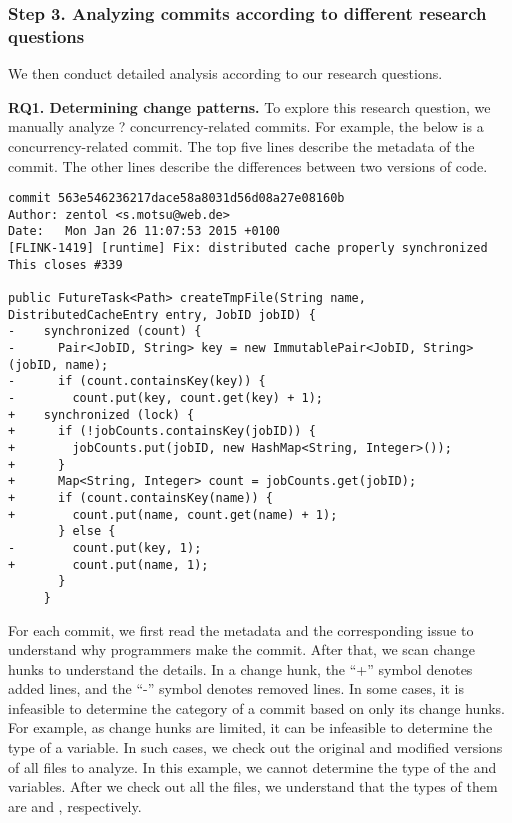 \subsubsection{Step 3. Analyzing commits according to different research questions} We then conduct detailed analysis according to our research questions.

\textbf{RQ1. Determining change patterns.} To explore this research question, we manually analyze ? concurrency-related commits. For example, the below is a concurrency-related commit. The top five lines describe the metadata of the commit. The other lines describe the differences between two versions of code.

\begin{lstlisting}
commit 563e546236217dace58a8031d56d08a27e08160b
Author: zentol <s.motsu@web.de>
Date:   Mon Jan 26 11:07:53 2015 +0100
[FLINK-1419] [runtime] Fix: distributed cache properly synchronized
This closes #339

public FutureTask<Path> createTmpFile(String name, DistributedCacheEntry entry, JobID jobID) {
-    synchronized (count) {
-      Pair<JobID, String> key = new ImmutablePair<JobID, String>(jobID, name);
-      if (count.containsKey(key)) {
-        count.put(key, count.get(key) + 1);
+    synchronized (lock) {
+      if (!jobCounts.containsKey(jobID)) {
+        jobCounts.put(jobID, new HashMap<String, Integer>());
+      }
+      Map<String, Integer> count = jobCounts.get(jobID);
+      if (count.containsKey(name)) {
+        count.put(name, count.get(name) + 1);
       } else {
-        count.put(key, 1);
+        count.put(name, 1);
       }
     }
\end{lstlisting}

For each commit, we first read the metadata and the corresponding issue to understand why programmers make the commit. After that, we scan change hunks to understand the details. In a change hunk, the ``+'' symbol denotes added lines, and the ``-'' symbol denotes removed lines. In some cases, it is infeasible to determine the category of a commit based on only its change hunks. For example, as change hunks are limited, it can be infeasible to determine the type of a variable. In such cases, we check out the original and modified versions of all files to analyze. In this example, we cannot determine the type of the  and  variables. After we check out all the files, we understand that the types of them are  and , respectively.


